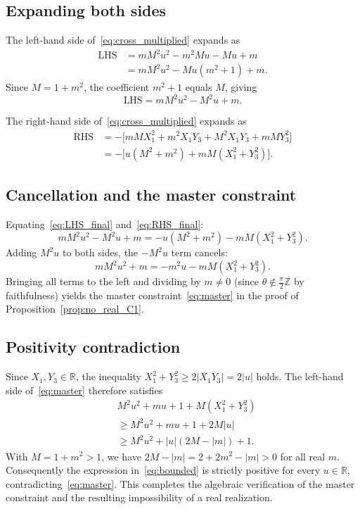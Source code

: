 \documentclass[
  twocolumn,
  aps,
  pra,
  floatfix,
  amsmath,amssymb,
  longbibliography
]{revtex4-2}
\theoremstyle{definition}
\theoremstyle{remark}
\begin{document}
\subsection*{Expanding both sides}

The left-hand side of~\eqref{eq:cross_multiplied} expands as
\begin{align}
\text{LHS} &= mM^2u^2 - m^2Mu - Mu + m \nonumber\\
           &= mM^2u^2 - Mu(m^2+1) + m. \label{eq:LHS_expanded}
\end{align}
Since $M = 1+m^2$, the coefficient $m^2+1$ equals $M$, giving
\begin{equation}
\text{LHS} = mM^2u^2 - M^2u + m.
\label{eq:LHS_final}
\end{equation}

The right-hand side of~\eqref{eq:cross_multiplied} expands as
\begin{align}
\text{RHS} &= -\bigl[mMX_1^2 + m^2X_1Y_3 + M^2X_1Y_3 + mMY_3^2\bigr] \nonumber\\
           &= -\bigl[u(M^2+m^2) + mM(X_1^2+Y_3^2)\bigr].
\label{eq:RHS_final}
\end{align}

\subsection*{Cancellation and the master constraint}

Equating~\eqref{eq:LHS_final} and~\eqref{eq:RHS_final}:
\begin{equation}
mM^2u^2 - M^2u + m = -u(M^2+m^2) - mM(X_1^2+Y_3^2).
\label{eq:equated}
\end{equation}
Adding $M^2u$ to both sides, the $-M^2u$ term cancels:
\begin{equation}
mM^2u^2 + m = -m^2u - mM(X_1^2+Y_3^2).
\label{eq:cancelled}
\end{equation}
Bringing all terms to the left and dividing by $m \neq 0$ (since
$\theta \notin \frac{\pi}{2}\mathbb{Z}$ by faithfulness) yields the
master constraint~\eqref{eq:master} in the proof of Proposition~\ref{prop:no_real_C1}.

\subsection*{Positivity contradiction}

Since $X_1,Y_3 \in \mathbb{R}$, the inequality
$X_1^2+Y_3^2 \geq 2|X_1Y_3| = 2|u|$ holds. The left-hand side
of~\eqref{eq:master} therefore satisfies
\begin{align}
&M^2u^2 + mu + 1 + M(X_1^2+Y_3^2) \nonumber\\
  &\geq M^2u^2 + mu + 1 + 2M|u| \nonumber\\
  &\geq M^2u^2 + |u|(2M - |m|) + 1.
\label{eq:bounded}
\end{align}
With $M = 1+m^2 > 1$, we have
$2M - |m| = 2+2m^2-|m| > 0$ for all real $m$. Consequently the
expression in~\eqref{eq:bounded} is strictly positive for every
$u \in \mathbb{R}$, contradicting~\eqref{eq:master}. This
completes the algebraic verification of the master constraint and
the resulting impossibility of a real realization.
\end{document}
